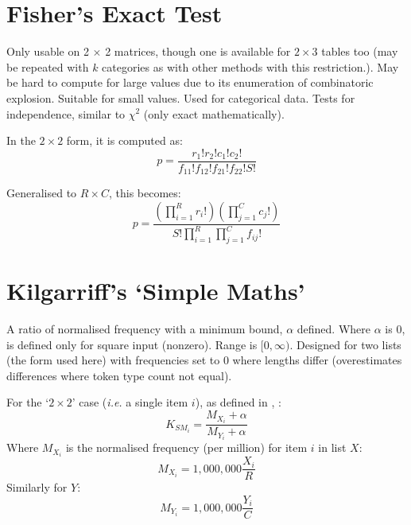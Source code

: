 \documentclass[11pt]{article}
\begin{document}
\section{Fisher's Exact Test}
Only usable on 2 $\times$ 2 matrices, though one is available for $2\times 3$ tables too (may be repeated with $k$ categories as with other methods with this restriction.).
May be hard to compute for large values due to its enumeration of combinatoric explosion.  Suitable for small values.  Used for categorical data.  Tests for independence, similar to $\chi^2$ (only exact mathematically). 

In the $2\times 2$ form, it is computed as:
$$
p = \frac{ r_1!r_2!c_1!c_2! }{ f_{11}!f_{12}!f_{21}!f_{22}!S! }
$$

Generalised to $R\times C$, this becomes:
$$
p = \frac{ (\prod_{i=1}^{R}{ r_i! })  (\prod_{j=1}^{C}{ c_j! }) }{ S! \prod_{i=1}^{R}{  \prod_{j=1}^{C}{ f_{ij}! }}    }
$$














\section{Kilgarriff's `Simple Maths'}
A ratio of normalised frequency with a minimum bound, $\alpha$ defined.  Where $\alpha$ is 0, is defined only for square input (nonzero).  Range is $[0, \infty)$.  Designed for two lists (the form used here) with frequencies set to 0 where lengths differ (overestimates differences where token type count not equal).

    For the `$2\times 2$' case (\textsl{i.e.} a single item $i$), as defined in \cite{kilgarriff2009simple}, \cite{kilgarriff2012getting}:
$$
K_{SM_i} = \frac{ M_{X_i} + \alpha }{ M_{Y_i} + \alpha }
$$
Where $M_{X_i}$ is the normalised frequency (per million) for item $i$ in list $X$:
$$
M_{X_i} = 1,000,000\frac{ X_i }{ R }
$$
Similarly for $Y$:
$$
M_{Y_i}= 1,000,000\frac{ Y_i }{ C }
$$
\end{document}
